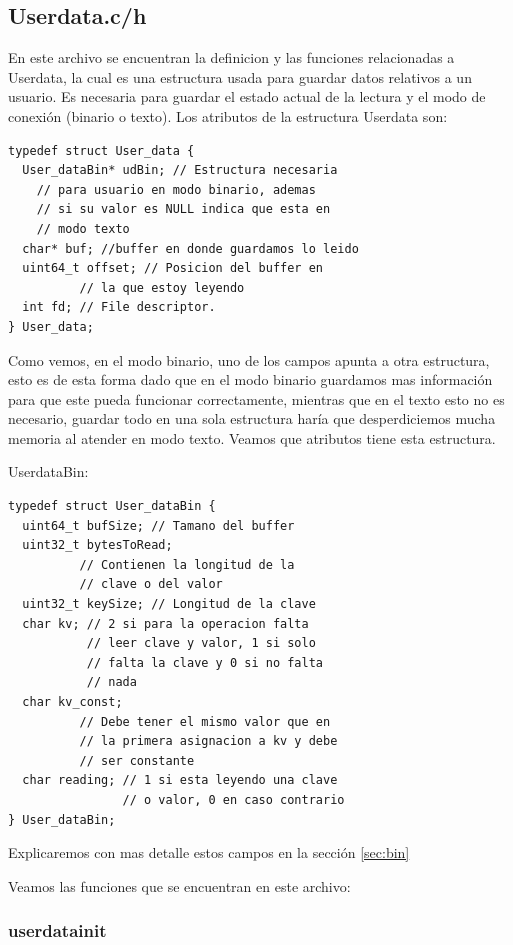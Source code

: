 \documentclass{article}
\begin{document}
\subsection{User\textunderscore data.c/h}
En este archivo se encuentran la definicion y las funciones relacionadas a User\textunderscore data, la cual es una estructura usada para guardar datos relativos a un usuario.
 Es necesaria para guardar el estado actual de la lectura y el modo de conexión (binario o texto).
 Los atributos de la estructura User\textunderscore data son:
\begin{lstlisting}[style=CStyle]
typedef struct User_data {  
  User_dataBin* udBin; // Estructura necesaria
    // para usuario en modo binario, ademas
    // si su valor es NULL indica que esta en
    // modo texto 
  char* buf; //buffer en donde guardamos lo leido  
  uint64_t offset; // Posicion del buffer en
          // la que estoy leyendo
  int fd; // File descriptor.
} User_data;
\end{lstlisting}

Como vemos, en el modo binario, uno de los campos apunta a otra estructura, esto es de esta forma dado que en el modo binario guardamos mas información para que este pueda funcionar correctamente, mientras que en el texto esto no es necesario, guardar todo en una sola estructura haría que desperdiciemos mucha memoria al atender en modo texto. Veamos que atributos tiene esta estructura.

User\textunderscore dataBin:

\begin{lstlisting}[style=CStyle]
    typedef struct User_dataBin {
  uint64_t bufSize; // Tamano del buffer
  uint32_t bytesToRead;
          // Contienen la longitud de la 
          // clave o del valor
  uint32_t keySize; // Longitud de la clave
  char kv; // 2 si para la operacion falta 
           // leer clave y valor, 1 si solo
           // falta la clave y 0 si no falta
           // nada
  char kv_const; 
          // Debe tener el mismo valor que en
          // la primera asignacion a kv y debe
          // ser constante 
  char reading; // 1 si esta leyendo una clave
                // o valor, 0 en caso contrario 
} User_dataBin;
\end{lstlisting}
Explicaremos con mas detalle estos campos en la sección \ref{sec:bin}

Veamos las funciones que se encuentran en este archivo:
\subsubsection{user\textunderscore data\textunderscore init}
\end{document}
